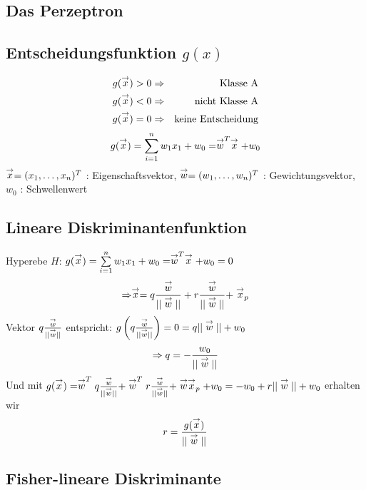 \subsection{Das Perzeptron}


\subsection{Entscheidungsfunktion $g(x)$}

\begin{eqnarray*}
g(\stackrel{\to}{x}) > 0 &\Rightarrow& \textrm{Klasse A} \\ g(\stackrel{\to}{x}) < 0 &\Rightarrow& \textrm{nicht Klasse A} \\ g(\stackrel{\to}{x}) = 0 &\Rightarrow& \textrm{keine Entscheidung}
\end{eqnarray*}
$$g(\stackrel{\to}{x}) = \sum\limits_{i=1}^n w_1x_1 + w_0 = \stackrel{\to}{w}^T \stackrel{\to}{x} + w_0$$
$\stackrel{\to}{x} = (x_1,\dots,x_n)^T$ : Eigenschaftsvektor, $\stackrel{\to}{w} = (w_1,\dots,w_n)^T$ : Gewichtungsvektor, $w_0$ : Schwellenwert

\subsection{Lineare Diskriminantenfunktion}

Hyperebe $H$: $g(\stackrel{\to}{x}) = \sum\limits_{i=1}^n w_1x_1 + w_0 = \stackrel{\to}{w}^T \stackrel{\to}{x} + w_0 = 0$
$$\Rightarrow \stackrel{\to}{x} = q \frac{\stackrel{\to}{w}}{|| \stackrel{\to}{w} ||} + r \frac{\stackrel{\to}{w}}{|| \stackrel{\to}{w} ||} + \stackrel{\to}{x}_p$$
Vektor $q \frac{\stackrel{\to}{w}}{|| \stackrel{\to}{w} ||}$ entspricht: $g \left(q \frac{\stackrel{\to}{w}}{|| \stackrel{\to}{w} ||} \right) = 0 = q ||\stackrel{\to}{w}|| + w_0$ $$\Rightarrow q = - \frac{w_0}{|| \stackrel{\to}{w} ||}$$
Und mit $g(\stackrel{\to}{x}) = \stackrel{\to}{w}^T q \frac{\stackrel{\to}{w}}{|| \stackrel{\to}{w} ||} + \stackrel{\to}{w}^T r \frac{\stackrel{\to}{w}}{|| \stackrel{\to}{w} ||} + \stackrel{\to}{w} \stackrel{\to}{x}_p + w_0 = -w_0 + r ||\stackrel{\to}{w}|| + w_0$ erhalten wir $$r = \frac{g(\stackrel{\to}{x})}{|| \stackrel{\to}{w} ||}$$

\subsection{Fisher-lineare Diskriminante}


